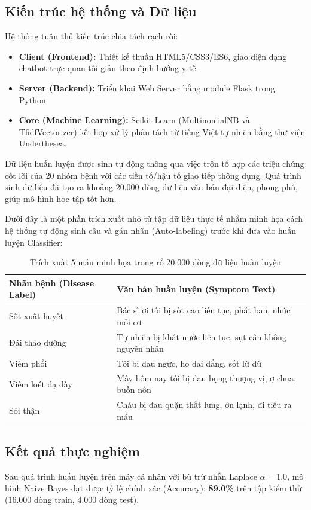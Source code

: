 \documentclass[12pt,a4paper]{report}
\begin{document}
\subsection{Kiến trúc hệ thống và Dữ liệu}
Hệ thống tuân thủ kiến trúc chia tách rạch ròi:
\begin{itemize}
    \item \textbf{Client (Frontend):} Thiết kế thuần HTML5/CSS3/ES6, giao diện dạng chatbot trực quan tối giản theo định hướng y tế.
    \item \textbf{Server (Backend):} Triển khai Web Server bằng module Flask trong Python.
    \item \textbf{Core (Machine Learning):} Scikit-Learn (MultinomialNB và TfidfVectorizer) kết hợp xử lý phân tách từ tiếng Việt tự nhiên bằng thư viện Underthesea.
\end{itemize}

Dữ liệu huấn luyện được sinh tự động thông qua việc trộn tổ hợp các triệu chứng cốt lõi của 20 nhóm bệnh với các tiền tố/hậu tố giao tiếp thông dụng. Quá trình sinh dữ liệu đã tạo ra khoảng 20.000 dòng dữ liệu văn bản đại diện, phong phú, giúp mô hình học tập tốt hơn. 

Dưới đây là một phần trích xuất nhỏ từ tập dữ liệu thực tế nhằm minh họa cách hệ thống tự động sinh câu và gán nhãn (Auto-labeling) trước khi đưa vào huấn luyện Classifier:

\begin{table}[H]
\centering
\begin{tabular}{|l|p{9.5cm}|}
\hline
\textbf{Nhãn bệnh (Disease Label)} & \textbf{Văn bản huấn luyện (Symptom Text)} \\ \hline
Sốt xuất huyết & Bác sĩ ơi tôi bị sốt cao liên tục, phát ban, nhức mỏi cơ \\ \hline
Đái tháo đường & Tự nhiên bị khát nước liên tục, sụt cân không nguyên nhân \\ \hline
Viêm phổi & Tôi bị đau ngực, ho dai dẳng, sốt lừ đừ \\ \hline
Viêm loét dạ dày & Mấy hôm nay tôi bị đau bụng thượng vị, ợ chua, buồn nôn \\ \hline
Sỏi thận & Cháu bị đau quặn thắt lưng, ớn lạnh, đi tiểu ra máu \\ \hline
\end{tabular}
\caption{Trích xuất 5 mẫu minh họa trong rổ 20.000 dòng dữ liệu huấn luyện}
\label{tab:data_sample}
\end{table}

\subsection{Kết quả thực nghiệm}
Sau quá trình huấn luyện trên máy cá nhân với bù trừ nhẵn Laplace $\alpha=1.0$, mô hình Naive Bayes đạt được tỷ lệ chính xác (Accuracy): \textbf{89.0\%} trên tập kiểm thử (16.000 dòng train, 4.000 dòng test).
\end{document}
